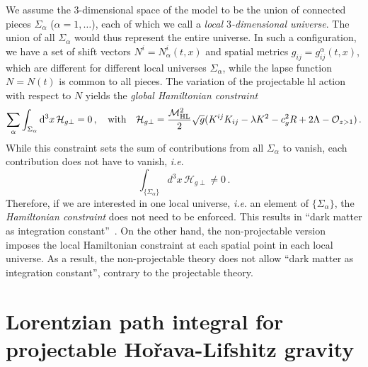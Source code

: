 \documentclass[superscriptaddress,aps,preprintnumbers,nofootinbib]{revtex4-2}
\begin{document}
We assume the $3$-dimensional space of the model to be the union of connected pieces $\Sigma_{\alpha}$ ($\alpha=1,\dots$), each of which we call a \textit{local $3$-dimensional universe}. The union of all $\Sigma_{\alpha}$ would thus represent the entire universe. In such a configuration, we have a set of shift vectors $N^i = N_{\alpha}^i(t,x)$ and spatial metrics $g_{ij} = g^{\alpha}_{ij}(t,x)$, which are different for different local universes $\Sigma_{\alpha}$, while the lapse function $N=N(t)$ is common to all pieces. The variation of the projectable \ac{hl} action with respect to $N$ yields the \textit{global Hamiltonian constraint} 
\begin{equation}
    \label{eq:Hamiltonian-constraint}
    \sum_{\alpha} \int_{\Sigma_{\alpha}}\mathrm{d}^3x\, \mathcal{H}_{g\perp}=0 \, ,
    \quad \text{with} \quad 
    \mathcal{H}_{g\perp} = \frac{{\cal M}_{\rm HL}^{2}}{2}\sqrt{g}( K^{ij}K_{ij}-\lambda K^2 - c^2_gR + 2\Lambda -{\mathcal O}_{z>1} )\,.
\end{equation}
While this constraint sets the sum of contributions from all $\Sigma_{\alpha}$ to vanish, each contribution does not have to vanish, \textit{i.e}.
\begin{equation}
    \int_{\{\Sigma_{\alpha}\}}d^3x\, \mathcal{H}_{g\perp} \ne 0 \, .
\end{equation}
Therefore, if we are interested in one local universe, \textit{i.e}. an element of $\{\Sigma_{\alpha}\}$, the \textit{Hamiltonian constraint} does not need to be enforced. This results in ``dark matter as integration constant''~\cite{Mukohyama:2009mz,Mukohyama:2009tp}. On the other hand, the non-projectable version imposes the local Hamiltonian constraint at each spatial point in each local universe. As a result, the non-projectable theory does not allow ``dark matter as integration constant'', contrary to the projectable theory. 




\section{Lorentzian path integral for projectable Ho\v{r}ava-Lifshitz gravity}
\label{sec:Lorentzian-path-integral}
\end{document}
